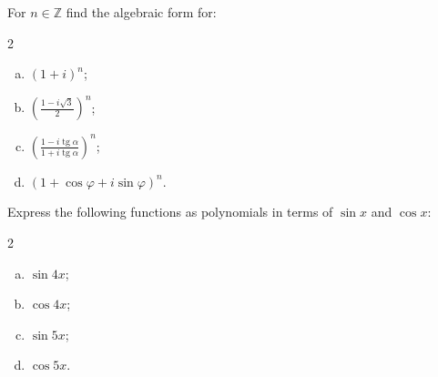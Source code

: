 \begin{problem}
For $n \in \mathbb{Z}$ find the algebraic form for:
\begin{multicols}{2}
\begin{enumerate}[a) ]
\item $(1+i)^n$;
\item $\left(\frac{1-i \sqrt{3}}{2}\right)^n$;
\item $\left(\frac{1-i \operatorname{tg} \alpha}{1+i \operatorname{tg} \alpha}\right)^n$;
\item $(1+\cos \varphi+i \sin \varphi)^n$.  
\end{enumerate}
\end{multicols}
\end{problem}

\begin{problem}
Express the following functions as polynomials in terms of $\sin x$ and $\cos x$:
\begin{multicols}{2}
\begin{enumerate}[a) ]
\item $\sin 4 x$;

\item $\cos 4 x$;

\item $\sin 5 x$;

\item $\cos 5 x$. 
\end{enumerate}  
\end{multicols}
\end{problem} 

